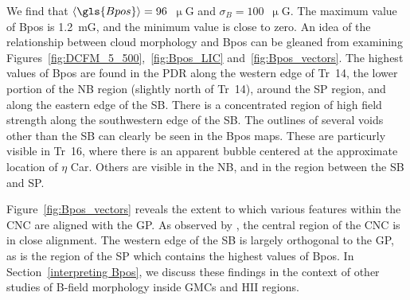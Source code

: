 We find that $\langle \gls{Bpos} \rangle = 96$~$\upmu$G and $\sigma_{B} = 100$~$\upmu$G. The maximum value of \gls{Bpos} is 1.2~mG, and the minimum value is close to zero. An idea of the relationship between cloud morphology and \gls{Bpos} can be gleaned from examining Figures~\ref{fig:DCFM_5_500},~\ref{fig:Bpos_LIC} and~\ref{fig:Bpos_vectors}. The highest values of \gls{Bpos} are found in the PDR along the western edge of Tr~14, the lower portion of the NB region (slightly north of Tr~14), around the SP region, and along the eastern edge of the SB\@. There is a concentrated region of high field strength along the southwestern edge of the SB\@. The outlines of several voids other than the SB can clearly be seen in the \gls{Bpos} maps. These are particurly visible in Tr~16, where there is an apparent bubble centered at the approximate location of $\eta$ Car. Others are visible in the NB, and in the region between the SB and SP\@.

Figure~\ref{fig:Bpos_vectors} reveals the extent to which various features within the CNC are aligned with the GP\@. As observed by \citet{li2006results}, the central region of the CNC is in close alignment. The western edge of the SB is largely orthogonal to the GP, as is the region of the SP which contains the highest values of \gls{Bpos}. In Section~\ref{interpreting Bpos}, we discuss these findings in the context of other studies of B-field morphology inside GMCs and HII regions.

